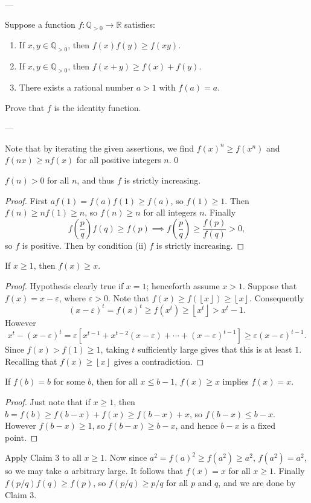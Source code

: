 
---

Suppose a function $f:\mathbb Q_{>0}\to\mathbb R$ satisfies:
\begin{enumerate}[label=(\roman*),itemsep=0em]
    \item If $x,y\in\mathbb Q_{>0}$, then $f(x)f(y)\ge f(xy)$.
    \item If $x,y\in\mathbb Q_{>0}$, then $f(x+y)\ge f(x)+f(y)$.
    \item There exists a rational number $a>1$ with $f(a)=a$.
\end{enumerate}
Prove that $f$ is the identity function.

---

Note that by iterating the given assertions, we find $f(x)^n\ge f(x^n)$ and $f(nx)\ge nf(x)$ for all positive integers $n$.
\setcounter{iclaim}0
\begin{iclaim}
    $f(n)>0$ for all $n$, and thus $f$ is strictly increasing. 
\end{iclaim}
\begin{proof}
    First $af(1)=f(a)f(1)\ge f(a)$, so $f(1)\ge1$. Then $f(n)\ge nf(1)\ge n$, so $f(n)\ge n$ for all integers $n$. Finally \[f\left(\frac pq\right)f(q)\ge f(p)\implies f\left(\frac pq\right)\ge\frac{f(p)}{f(q)}>0,\]
    so $f$ is positive. Then by condition (ii) $f$ is strictly increasing.
\end{proof}
\begin{iclaim}
    If $x\ge1$, then $f(x)\ge x$.
\end{iclaim}
\begin{proof}
    Hypothesis clearly true if $x=1$; henceforth assume $x>1$. Suppose that $f(x)=x-\varepsilon$, where $\varepsilon>0$. Note that $f(x)\ge f(\left\lfloor x\right\rfloor)\ge\left\lfloor x\right\rfloor$. Consequently \[(x-\varepsilon)^t=f(x)^t\ge f(x^t)\ge\left\lfloor x^t\right\rfloor>x^t-1.\]
    However \[x^t-(x-\varepsilon)^t=\varepsilon\left[x^{t-1}+x^{t-2}(x-\varepsilon)+\cdots+(x-\varepsilon)^{t-1}\right]\ge\varepsilon(x-\varepsilon)^{t-1}.\]
    Since $f(x)>f(1)\ge1$, taking $t$ sufficiently large gives that this is at least $1$. Recalling that $f(x)\ge\left\lfloor x\right\rfloor$ gives a contradiction.
\end{proof}
\begin{iclaim}
    If $f(b)=b$ for some $b$, then for all $x\le b-1$, $f(x)\ge x$ implies $f(x)=x$.
\end{iclaim}
\begin{proof}
    Just note that if $x\ge1$, then $b=f(b)\ge f(b-x)+f(x)\ge f(b-x)+x$, so $f(b-x)\le b-x$. However $f(b-x)\ge1$, so $f(b-x)\ge b-x$, and hence $b-x$ is a fixed point.
\end{proof}

Apply Claim 3 to all $x\ge1$. Now since $a^2=f(a)^2\ge f(a^2)\ge a^2$, $f(a^2)=a^2$, so we may take $a$ arbitrary large. It follows that $f(x)=x$ for all $x\ge1$. Finally $f(p/q)f(q)\ge f(p)$, so $f(p/q)\ge p/q$ for all $p$ and $q$, and we are done by Claim 3.
